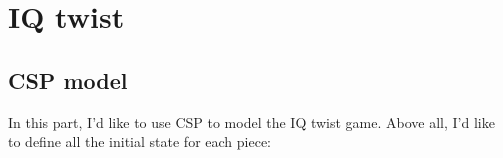 \chapter{IQ twist}
\section{CSP model}
\newcommand{\VUnits} {\ensuremath{V_{units}}}
\newcommand{\VPegs} {\ensuremath{V_{pegs}}}
\newcommand{\Constraints}[2] {\ensuremath{C_{v_{#1},v_{#2}}}}
\newcommand{\Cons}[5] {\ensuremath{C_{v_{#1},v_{#2},v_{#3},v_{#4},v_{#5}}}}
\newcommand{\Con}[4] {\ensuremath{C_{v_{#1},v_{#2},v_{#3},v_{#4}}}}
\newcommand{\Constraint}[1] {\ensuremath{C_{v_{#1}}}}
\newcommand{\Domain}[1] {\ensuremath{D(v_{#1})}}
\label{sec:CSP model}
In this part, I'd like to use CSP to model the IQ twist game. Above all, I'd like to define all the initial state for each piece:
